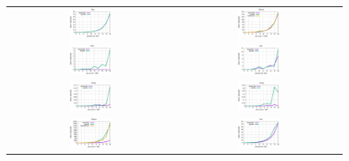 \documentclass[conference,compsoc]{IEEEtran}
\begin{document}
\begin{figure}[h!]
  \centering
  \setlength\tabcolsep{0.01pt}
  \begin{tabular}{cc}

    \includegraphics[width=0.265\textwidth]{plots/Map.eps} & \includegraphics[width=0.265\textwidth]{plots/Reduce.eps}\\
    \includegraphics[width=0.265\textwidth]{plots/Pack.eps} & \includegraphics[width=0.265\textwidth]{plots/Split.eps}\\
    \includegraphics[width=0.265\textwidth]{plots/Gather.eps} & \includegraphics[width=0.265\textwidth]{plots/Scatter.eps}\\
    \includegraphics[width=0.265\textwidth]{plots/Pipeline.eps} & \includegraphics[width=0.265\textwidth]{plots/Farm.eps}\\

\end{tabular}
\end{figure}
\end{document}
